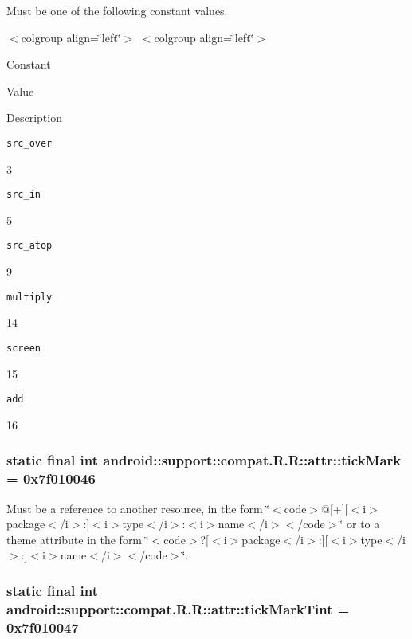 Must be one of the following constant values. \begin{TabularC}{0}
\hline
\end{TabularC}
$<$colgroup align=\char`\"{}left\char`\"{}$>$ $<$colgroup align=\char`\"{}left\char`\"{}$>$ 

Constant

Value

Description 

{\tt src\_\-over}

3

{\tt src\_\-in}

5

{\tt src\_\-atop}

9

{\tt multiply}

14

{\tt screen}

15

{\tt add}

16\hypertarget{classandroid_1_1support_1_1compat_1_1_r_1_1attr_b0476fe6d8e6e16dd0c54d8135a85b3d}{
\subsubsection[{tickMark}]{\setlength{\rightskip}{0pt plus 5cm}static final int android::support::compat.R.R::attr::tickMark = 0x7f010046}}
\label{classandroid_1_1support_1_1compat_1_1_r_1_1attr_b0476fe6d8e6e16dd0c54d8135a85b3d}


Must be a reference to another resource, in the form \char`\"{}$<$code$>$@\mbox{[}+\mbox{]}\mbox{[}$<$i$>$package$<$/i$>$:\mbox{]}$<$i$>$type$<$/i$>$:$<$i$>$name$<$/i$>$$<$/code$>$\char`\"{} or to a theme attribute in the form \char`\"{}$<$code$>$?\mbox{[}$<$i$>$package$<$/i$>$:\mbox{]}\mbox{[}$<$i$>$type$<$/i$>$:\mbox{]}$<$i$>$name$<$/i$>$$<$/code$>$\char`\"{}. \hypertarget{classandroid_1_1support_1_1compat_1_1_r_1_1attr_eab096d03ed7df3ba8efbacca7519b90}{
\subsubsection[{tickMarkTint}]{\setlength{\rightskip}{0pt plus 5cm}static final int android::support::compat.R.R::attr::tickMarkTint = 0x7f010047}}
\label{classandroid_1_1support_1_1compat_1_1_r_1_1attr_eab096d03ed7df3ba8efbacca7519b90}



